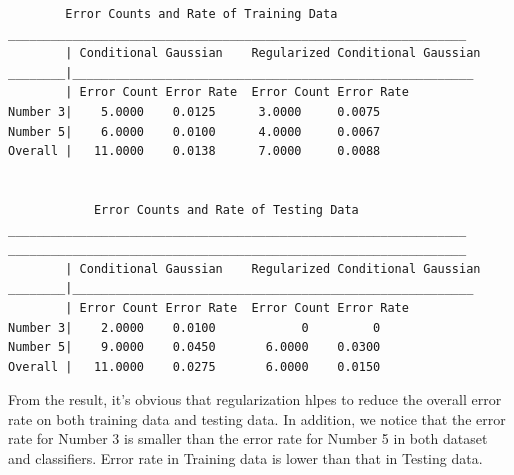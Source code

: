 \documentclass[12pt]{article}
\begin{document}
\begin{verbatim}
		Error Counts and Rate of Training Data
________________________________________________________________
        | Conditional Gaussian    Regularized Conditional Gaussian
________|________________________________________________________
        | Error Count Error Rate  Error Count Error Rate  
Number 3|    5.0000    0.0125      3.0000     0.0075
Number 5|    6.0000    0.0100      4.0000     0.0067
Overall |   11.0000    0.0138      7.0000     0.0088


			Error Counts and Rate of Testing Data 
________________________________________________________________
________________________________________________________________
        | Conditional Gaussian    Regularized Conditional Gaussian
________|________________________________________________________
        | Error Count Error Rate  Error Count Error Rate  
Number 3|    2.0000    0.0100            0         0
Number 5|    9.0000    0.0450       6.0000    0.0300
Overall |   11.0000    0.0275       6.0000    0.0150
\end{verbatim}

From the result, it's obvious that regularization hlpes to reduce the overall error rate on both training data and testing data. In addition, we notice that the error rate for Number 3 is smaller than the error rate for Number 5 in both dataset and classifiers. Error rate in Training data is lower than that in Testing data.

\cleardoublepage
\end{document}
